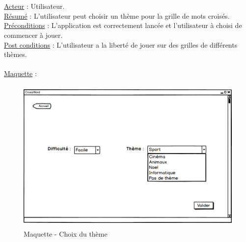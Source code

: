 \documentclass [ 11 pt ] {article}
\begin{document}
\newpage
{} \\ \\%
\underline {Acteur} : Utilisateur. \\
\underline {Résumé} : L'utilisateur peut choisir un thème pour la grille de mots croisés. \\
\underline {Préconditions} : L'application est correctement lancée et l'utilisateur à choisi de commencer à jouer. \\
\underline {Post conditions} : L'utilisateur a la liberté de jouer sur des grilles de différents thèmes. \\\\
\underline {Maquette} : \\%

    \begin{figure}[H]
    \begin{center}
        \includegraphics[height=3in]{Maquettes/ChoixTheme_deroule.png}
        \caption{Maquette - Choix du thème} 
        \end{center}
    \end{figure}
\end{document}

